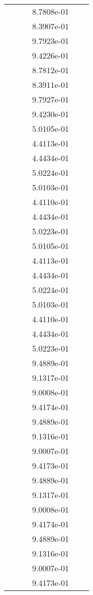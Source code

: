 \begin{xltabular}{\textwidth}{r|rS[table-format=1.3e+2]S[table-format=1.4e+2]S[table-format=1.4e+2]S[table-format=-1.5]}
&  &  & 8.7808e-01 & & \\
&  &  & 8.3907e-01 & & \\
&  &  & 9.7923e-01 & & \\
&  &  & 9.4226e-01 & & \\
&  &  & 8.7812e-01 & & \\
&  &  & 8.3911e-01 & & \\
&  &  & 9.7927e-01 & & \\
&  &  & 9.4230e-01 & & \\
&  &  & 5.0105e-01 & & \\
&  &  & 4.4113e-01 & & \\
&  &  & 4.4434e-01 & & \\
&  &  & 5.0224e-01 & & \\
&  &  & 5.0103e-01 & & \\
&  &  & 4.4110e-01 & & \\
&  &  & 4.4434e-01 & & \\
&  &  & 5.0223e-01 & & \\
&  &  & 5.0105e-01 & & \\
&  &  & 4.4113e-01 & & \\
&  &  & 4.4434e-01 & & \\
&  &  & 5.0224e-01 & & \\
&  &  & 5.0103e-01 & & \\
&  &  & 4.4110e-01 & & \\
&  &  & 4.4434e-01 & & \\
&  &  & 5.0223e-01 & & \\
&  &  & 9.4889e-01 & & \\
&  &  & 9.1317e-01 & & \\
&  &  & 9.0008e-01 & & \\
&  &  & 9.4174e-01 & & \\
&  &  & 9.4889e-01 & & \\
&  &  & 9.1316e-01 & & \\
&  &  & 9.0007e-01 & & \\
&  &  & 9.4173e-01 & & \\
&  &  & 9.4889e-01 & & \\
&  &  & 9.1317e-01 & & \\
&  &  & 9.0008e-01 & & \\
&  &  & 9.4174e-01 & & \\
&  &  & 9.4889e-01 & & \\
&  &  & 9.1316e-01 & & \\
&  &  & 9.0007e-01 & & \\
&  &  & 9.4173e-01 & & \\

\end{xltabular}
